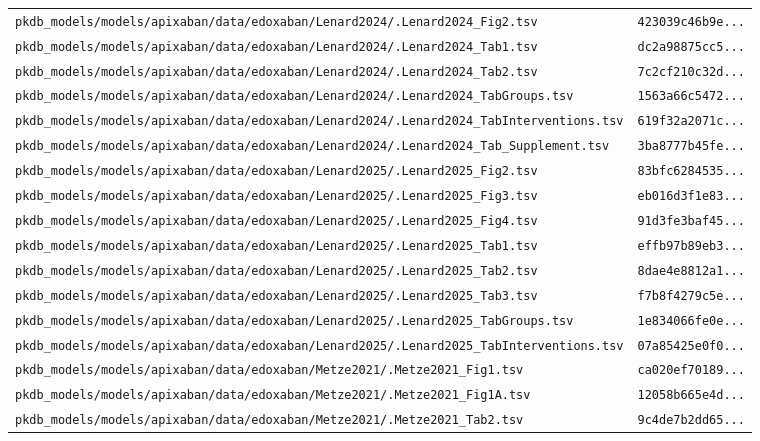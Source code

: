 \begin{longtable}{ll}
\texttt{pkdb\_models/models/apixaban/data/edoxaban/Lenard2024/.Lenard2024\_Fig2.tsv} & \texttt{423039c46b9e...} \\
\texttt{pkdb\_models/models/apixaban/data/edoxaban/Lenard2024/.Lenard2024\_Tab1.tsv} & \texttt{dc2a98875cc5...} \\
\texttt{pkdb\_models/models/apixaban/data/edoxaban/Lenard2024/.Lenard2024\_Tab2.tsv} & \texttt{7c2cf210c32d...} \\
\texttt{pkdb\_models/models/apixaban/data/edoxaban/Lenard2024/.Lenard2024\_TabGroups.tsv} & \texttt{1563a66c5472...} \\
\texttt{pkdb\_models/models/apixaban/data/edoxaban/Lenard2024/.Lenard2024\_TabInterventions.tsv} & \texttt{619f32a2071c...} \\
\texttt{pkdb\_models/models/apixaban/data/edoxaban/Lenard2024/.Lenard2024\_Tab\_Supplement.tsv} & \texttt{3ba8777b45fe...} \\
\texttt{pkdb\_models/models/apixaban/data/edoxaban/Lenard2025/.Lenard2025\_Fig2.tsv} & \texttt{83bfc6284535...} \\
\texttt{pkdb\_models/models/apixaban/data/edoxaban/Lenard2025/.Lenard2025\_Fig3.tsv} & \texttt{eb016d3f1e83...} \\
\texttt{pkdb\_models/models/apixaban/data/edoxaban/Lenard2025/.Lenard2025\_Fig4.tsv} & \texttt{91d3fe3baf45...} \\
\texttt{pkdb\_models/models/apixaban/data/edoxaban/Lenard2025/.Lenard2025\_Tab1.tsv} & \texttt{effb97b89eb3...} \\
\texttt{pkdb\_models/models/apixaban/data/edoxaban/Lenard2025/.Lenard2025\_Tab2.tsv} & \texttt{8dae4e8812a1...} \\
\texttt{pkdb\_models/models/apixaban/data/edoxaban/Lenard2025/.Lenard2025\_Tab3.tsv} & \texttt{f7b8f4279c5e...} \\
\texttt{pkdb\_models/models/apixaban/data/edoxaban/Lenard2025/.Lenard2025\_TabGroups.tsv} & \texttt{1e834066fe0e...} \\
\texttt{pkdb\_models/models/apixaban/data/edoxaban/Lenard2025/.Lenard2025\_TabInterventions.tsv} & \texttt{07a85425e0f0...} \\
\texttt{pkdb\_models/models/apixaban/data/edoxaban/Metze2021/.Metze2021\_Fig1.tsv} & \texttt{ca020ef70189...} \\
\texttt{pkdb\_models/models/apixaban/data/edoxaban/Metze2021/.Metze2021\_Fig1A.tsv} & \texttt{12058b665e4d...} \\
\texttt{pkdb\_models/models/apixaban/data/edoxaban/Metze2021/.Metze2021\_Tab2.tsv} & \texttt{9c4de7b2dd65...} \\

\end{longtable}
